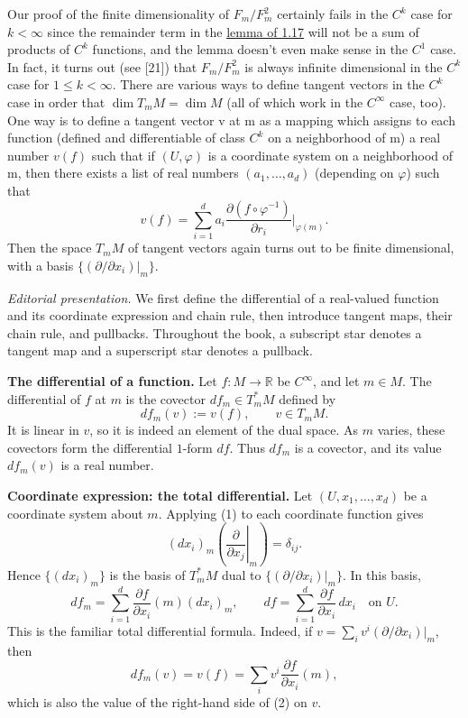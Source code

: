 \label{thm:1.21}
Our proof of the finite dimensionality of $F_m/F_m^2$ certainly fails in the  $ C^k $ case for  $ k < \infty $ since the remainder term in the \hyperref[thm:1.17]{lemma of 1.17} will not be a sum of products of  $ C^k $ functions, and the lemma doesn't even make sense in the  $ C^1 $ case. In fact, it turns out (see [21]) that $F_m/F_m^2$ is always infinite dimensional in the  $ C^k $ case for  $ 1 \leq k < \infty $. There are various ways to define tangent vectors in the  $ C^k $ case in order that  $ \dim T_{m} M = \dim M $ (all of which work in the  $ C^\infty $ case, too). One way is to define a tangent vector v at m as a mapping which assigns to each function (defined and differentiable of class  $ C^k $ on a neighborhood of m) a real number  $ v(f) $ such that if  $ (U, \varphi) $ is a coordinate system on a neighborhood of m, then there exists a list of real numbers  $ (a_1, \ldots, a_d) $ (depending on  $ \varphi $) such that
\[
	v(f)=\sum_{i=1}^{d}a_{i}\frac{\partial(f\circ\varphi^{-1})}{\partial r_{i}}\bigg|_{\varphi(m)}.
\]
Then the space  $ T_{m} M $ of tangent vectors again turns out to be finite dimensional, with a basis  $ \{(\partial/\partial x_i)\big|_{m}\} $.

\label{thm:1.22}
\noindent\textit{Editorial presentation.}
We first define the differential of a real-valued function and its
coordinate expression and chain rule, then introduce tangent maps,
their chain rule, and pullbacks.
Throughout the book, a subscript star denotes a tangent map and a
superscript star denotes a pullback.

\medskip\noindent\textbf{The differential of a function.}
Let $f:M\to\mathbb R$ be $C^\infty$, and let $m\in M$.
The differential of $f$ at $m$ is the covector $df_m\in T_m^*M$
defined by
\begin{equation}
  \tag{1}\label{eq:1.22:1}
  df_m(v):=v(f),\qquad v\in T_mM.
\end{equation}
It is linear in $v$, so it is indeed an element of the dual space.
As $m$ varies, these covectors form the differential $1$-form $df$.
Thus $df_m$ is a covector, and its value $df_m(v)$ is a real number.

\medskip\noindent\textbf{Coordinate expression: the total differential.}
Let $(U,x_1,\ldots,x_d)$ be a coordinate system about $m$.
Applying (1) to each coordinate function gives
\[
  (dx_i)_m\!\left(\left.\frac{\partial}{\partial x_j}\right|_m\right)
  =\delta_{ij}.
\]
Hence $\{(dx_i)_m\}$ is the basis of $T_m^*M$ dual to
$\{(\partial/\partial x_i)|_m\}$. In this basis,
\begin{equation}
  \tag{2}\label{eq:1.22:2}
  df_m=\sum_{i=1}^d\frac{\partial f}{\partial x_i}(m)(dx_i)_m,
  \qquad
  df=\sum_{i=1}^d\frac{\partial f}{\partial x_i}\,dx_i
  \quad\text{on }U.
\end{equation}
This is the familiar total differential formula. Indeed, if
$v=\sum_i v^i(\partial/\partial x_i)|_m$, then
\[
  df_m(v)=v(f)=\sum_i v^i\frac{\partial f}{\partial x_i}(m),
\]
which is also the value of the right-hand side of (2) on $v$.

